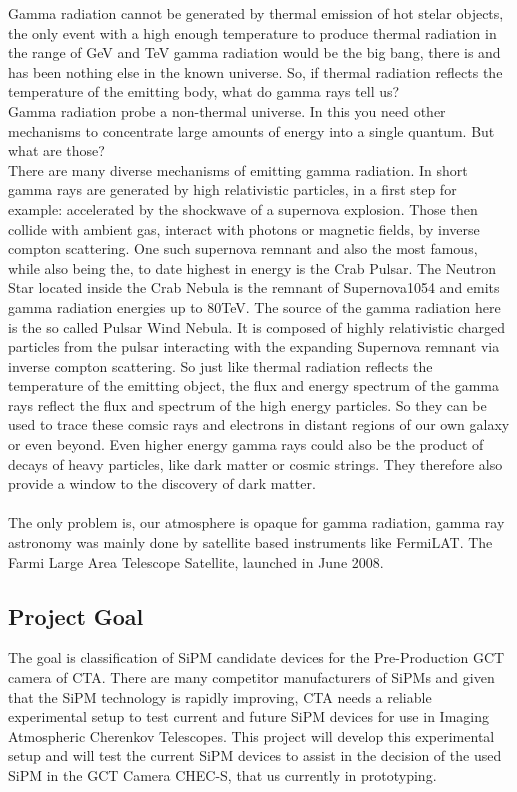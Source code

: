 \documentclass[article,type=pp,colorback,accentcolor=tud9c]{tudthesis}
\begin{document}
Gamma radiation cannot be generated by thermal emission of hot stelar objects, the only event  with a high enough temperature to produce thermal radiation in the range of GeV and TeV gamma radiation would be the big bang, there is and has been nothing else in the known universe. So, if thermal radiation reflects the temperature of the emitting body, what do gamma rays tell us?\\
Gamma radiation probe a non-thermal universe. In this you need other mechanisms to concentrate large amounts of energy into a single quantum. But what are those?\\
There are many diverse mechanisms of emitting gamma radiation. In short gamma rays are generated by high relativistic particles, in a first step for example: accelerated by the shockwave of a supernova explosion. Those then collide with ambient gas, interact with photons or magnetic fields, by inverse compton scattering.
One such supernova remnant and also the most famous, while also being the, to date highest in energy is the Crab Pulsar. The Neutron Star located inside the Crab Nebula is the remnant of Supernova1054 and emits gamma radiation energies up to 80TeV. The source of the gamma radiation here is the so called Pulsar Wind Nebula. It is composed of highly relativistic charged particles from the pulsar interacting with the expanding Supernova remnant via inverse compton scattering.
So just like thermal radiation reflects the temperature of the emitting object, the flux and energy spectrum of the gamma rays reflect the flux and spectrum of the high energy particles. So they can be used to trace these comsic rays and electrons in distant regions of our own galaxy or even beyond.
Even higher energy gamma rays could also be the product of decays of heavy particles, like dark matter or cosmic strings.  They therefore also provide a window to the discovery of dark matter.\\ \\
The only problem is, our atmosphere is opaque for gamma radiation, gamma ray astronomy was mainly done by satellite based instruments like FermiLAT. The Farmi Large Area Telescope Satellite, launched in June 2008.

    
   \newpage
    \subsection{Project Goal}
    The goal is classification of SiPM candidate devices for the Pre-Production GCT camera of CTA. There are many competitor manufacturers of SiPMs and given that the SiPM technology is rapidly improving, CTA needs a reliable experimental setup to test current and future SiPM devices for use in Imaging Atmospheric Cherenkov Telescopes. This project will develop this experimental setup and will test the current SiPM devices to assist in the decision of the used SiPM in the GCT Camera CHEC-S, that us currently in prototyping.
\end{document}
